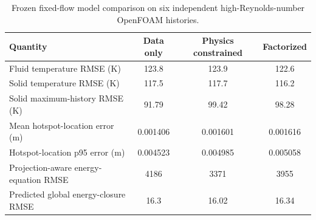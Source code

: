\begin{table}[t]
\centering
\caption{Frozen fixed-flow model comparison on six independent high-Reynolds-number OpenFOAM histories.}
\label{tab:p418_high_re_frozen_comparison}
\begin{tabular}{lccc}
\hline
Quantity & Data only & Physics constrained & Factorized \\
\hline
Fluid temperature RMSE (K) & 123.8 & 123.9 & 122.6 \\
Solid temperature RMSE (K) & 117.5 & 117.7 & 116.2 \\
Solid maximum-history RMSE (K) & 91.79 & 99.42 & 98.28 \\
Mean hotspot-location error (m) & 0.001406 & 0.001601 & 0.001616 \\
Hotspot-location p95 error (m) & 0.004523 & 0.004985 & 0.005058 \\
Projection-aware energy-equation RMSE & 4186 & 3371 & 3955 \\
Predicted global energy-closure RMSE & 16.3 & 16.02 & 16.34 \\
\hline
\end{tabular}
\end{table}
